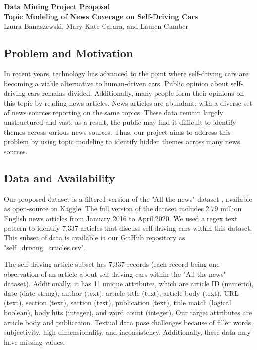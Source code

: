 \documentclass{article}
\begin{document}
\begin{center}
    {\Large\bfseries Data Mining Project Proposal}\\[6pt]
    {\large \bfseries Topic Modeling of News Coverage on Self-Driving Cars} \\[6pt]
    { \large Laura Banaszewski, Mary Kate Carara, and Lauren Gamber}\\[2pt]
\end{center}


\subsection*{Problem and Motivation}
In recent years, technology has advanced to the point where self-driving cars are becoming a viable alternative to human-driven cars. Public opinion about self-driving cars remains divided. Additionally, many people form their opinions on this topic by reading news articles. News articles are abundant, with a diverse set of news sources reporting on the same topics. These data remain largely unstructured and vast; as a result, the public may find it difficult to identify themes across various news sources. Thus, our project aims to address this problem by using topic modeling to identify hidden themes across many news sources.      


\subsection*{Data and Availability}
Our proposed dataset is a filtered version of the "All the news" dataset \parencite{mckinley2021}, available as open-source on Kaggle. The full version of the dataset includes 2.79 million English news articles from January 2016 to April 2020. We used a regex text pattern to identify 7,337 articles that discuss self-driving cars within this dataset. This subset of data is available in our GitHub repository as "self\_driving\_articles.csv". 

The self-driving article subset has 7,337 records (each record being one observation of an article about self-driving cars within the "All the news" dataset). Additionally, it has 11 unique attributes, which are article ID (numeric), date (date string), author (text), article title (text), article body (text), URL (text), section (text), section (text), publication (text), title match (logical boolean), body hits (integer), and word count (integer). Our target attributes are article body and publication. Textual data pose challenges because of filler words, subjectivity, high dimensionality, and inconsistency. Additionally, these data may have missing values. 
\end{document}
